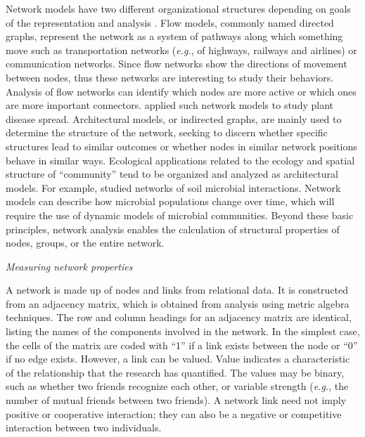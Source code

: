 \documentclass[12pt, oneside]{report}
\begin{document}
Network models have two different organizational structures depending on goals of the representation and analysis \citep{borgatti2013analyzing}. Flow models, commonly named directed graphs, represent the network as a system of pathways along which something move such as transportation networks (\textit{e.g.}, of highways, railways and airlines) or communication networks. Since flow networks show the directions of movement between nodes, thus these networks are interesting to study their behaviors. Analysis of flow networks can identify which nodes are more active or which ones are more important connectors. \citet{Jeger:2007tn, Shaw:2014cka} applied such network models to study plant disease spread. Architectural models, or indirected graphs, are mainly used to determine the structure of the network, seeking to discern whether specific structures lead to similar outcomes or whether nodes in similar network positions behave in similar ways. Ecological applications related to the ecology and spatial structure of ``community'' tend to be organized and analyzed as architectural models. For example, \citet{Faust:2012dk} studied networks of soil microbial interactions. Network models can describe how microbial populations change over time, which will require the use of dynamic models of microbial communities. Beyond these basic principles, network analysis enables the calculation of structural properties of nodes, groups, or the entire network.

\textit{Measuring network properties}

A network is made up of nodes and links from relational data. It is constructed from an adjacency matrix, which is obtained from analysis using metric algebra techniques. The row and column headings for an adjacency matrix are identical, listing the names of the components involved in the network. In the simplest case, the cells of the matrix are coded with ``1'' if a link exists between the node or ``0'' if no edge exists. However, a link can be valued. Value indicates a characteristic of the relationship that the research has quantified. The values may be binary, such as whether two friends recognize each other, or variable strength (\textit{e.g.}, the number of mutual friends between two friends). A network link need not imply positive or cooperative interaction; they can also be a negative or competitive interaction between two individuals. 
\end{document}
